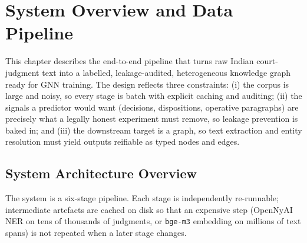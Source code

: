 \chapter{System Overview and Data Pipeline}
\label{chap:pipeline}

This chapter describes the end-to-end pipeline that turns raw Indian court-judgment text into a labelled, leakage-audited, heterogeneous knowledge graph ready for GNN training. The design reflects three constraints: (i) the corpus is large and noisy, so every stage is batch with explicit caching and auditing; (ii) the signals a predictor would want (decisions, dispositions, operative paragraphs) are precisely what a legally honest experiment must remove, so leakage prevention is baked in; and (iii) the downstream target is a graph, so text extraction and entity resolution must yield outputs reifiable as typed nodes and edges.

\section{System Architecture Overview}

The system is a six-stage pipeline. Each stage is independently re-runnable; intermediate artefacts are cached on disk so that an expensive step (OpenNyAI NER on tens of thousands of judgments, or \texttt{bge-m3} embedding on millions of text spans) is not repeated when a later stage changes.

